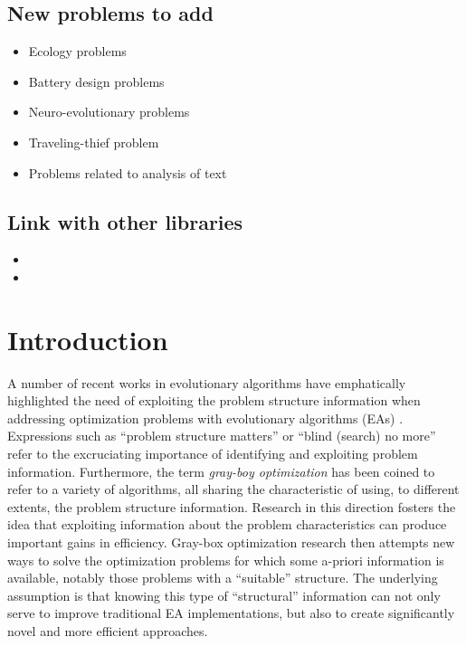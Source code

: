 \documentclass{article} %
\begin{document}
\subsection{New problems to add}
  \begin{itemize}
    \item Ecology problems
    \item Battery design problems
    \item Neuro-evolutionary problems
    \item Traveling-thief problem
    \item Problems related to analysis of text
  \end{itemize}

  

\subsection{Link with other libraries}
  \begin{itemize}
  \item 
  \item
  \end{itemize}


  
  
\section{Introduction}

 
A number of recent works in evolutionary algorithms have emphatically highlighted the need of exploiting the problem structure information when addressing optimization problems with evolutionary algorithms (EAs) \cite{Whitley:2015a,Whitley2016a}. Expressions such as ``problem structure matters'' \cite{Whitley:2015a}  or ``blind (search) no more'' \cite{Whitley2016a} refer to the excruciating importance of identifying and exploiting problem information. Furthermore, the term \emph{gray-boy optimization} has been coined to refer to a variety of algorithms, all sharing the characteristic of using,  to different extents,  the problem structure information. Research in this direction fosters the idea that exploiting  information about the problem characteristics can produce important gains in efficiency.  Gray-box optimization research then attempts new ways to solve the optimization problems for which some a-priori information is available, notably those problems with a  ``suitable'' structure. The underlying assumption is that knowing this type of ``structural'' information can not only serve to improve traditional EA implementations, but also to create significantly novel and more efficient approaches.
\end{document}
